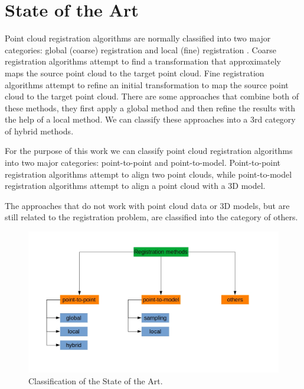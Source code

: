

    \chapter{State of the Art}
    \label{chap:State of the Art}
    Point cloud registration algorithms are normally classified into two major categories: global (coarse) registration and local (fine) registration \cite{Quan_2020_com,Kim_2011_fully}.
    Coarse registration algorithms attempt to find a transformation that approximately maps the source point cloud to the target point cloud. 
    Fine registration algorithms attempt to refine an initial transformation to map the source point cloud to the target point cloud.
    There are some approaches that combine both of these methods, they first apply a global method and then refine the results with the help of a local method. 
    We can classify these approaches into a 3rd category of hybrid methods. 
    \par
    
    For the purpose of this work we can classify point cloud registration algorithms into two major categories:
    point-to-point and point-to-model.
    Point-to-point registration algorithms attempt to align two point clouds, while point-to-model registration algorithms attempt to align a point cloud with a 3D model.

    The approaches that do not work with point cloud data or 3D models, but are still related to the registration problem, are classified into the category of others.

    \begin{figure}[H]
        \includegraphics[width=\textwidth]{images/Classification.jpg}
        \caption{Classification of the State of the Art.}
        \label{fig:classification}
    \end{figure}

